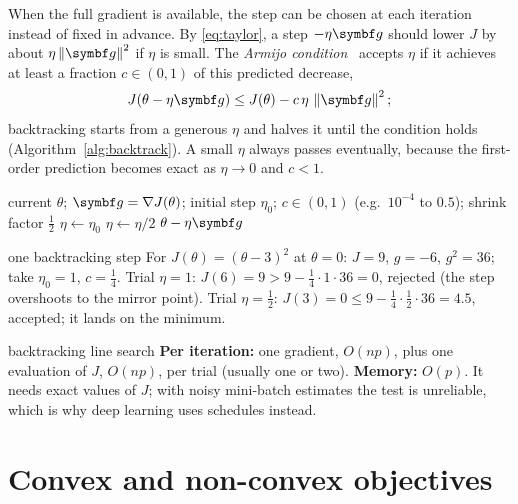 \documentclass[11pt]{article}
\newcommand{\gvec}{\vect{g}}
\begin{document}
When the full gradient is available, the step can be chosen at each iteration instead of fixed in advance. By
\eqref{eq:taylor}, a step $-\eta\gvec$ should lower $J$ by about $\eta\norm{\gvec}^2$ if $\eta$ is small. The
\emph{Armijo condition}~\cite{armijo1966} accepts $\eta$ if it achieves at least a fraction $c \in (0, 1)$ of this
predicted decrease,
\[
  J(\theta - \eta\gvec) \le J(\theta) - c\,\eta\,\norm{\gvec}^2 ;
\]
backtracking starts from a generous $\eta$ and halves it until the condition holds (Algorithm~\ref{alg:backtrack}).
A small $\eta$ always passes eventually, because the first-order prediction becomes exact as $\eta \to 0$ and $c < 1$.

\begin{algorithm}[tb]
\caption{Gradient step with backtracking (Armijo) line search}\label{alg:backtrack}
\begin{algorithmic}[1]
\Require current $\theta$; $\gvec = \nabla J(\theta)$; initial step $\eta_0$; $c \in (0, 1)$ (e.g.\ $10^{-4}$ to $0.5$); shrink factor $\frac12$
\Function{BacktrackingStep}{$\theta, \gvec$}
  \State $\eta \gets \eta_0$
  \While{$J(\theta - \eta\gvec) > J(\theta) - c\,\eta\norm{\gvec}^2$} 
    \State $\eta \gets \eta/2$
  \EndWhile
  \State \Return $\theta - \eta\gvec$
\EndFunction
\end{algorithmic}
\end{algorithm}

\begin{worked}{one backtracking step}
For $J(\theta) = (\theta - 3)^2$ at $\theta = 0$: $J = 9$, $g = -6$, $g^2 = 36$; take $\eta_0 = 1$, $c = \frac14$.
Trial $\eta = 1$: $J(6) = 9 > 9 - \frac14 \cdot 1 \cdot 36 = 0$, rejected (the step overshoots to the mirror point).
Trial $\eta = \frac12$: $J(3) = 0 \le 9 - \frac14 \cdot \frac12 \cdot 36 = 4.5$, accepted; it lands on the minimum.
\end{worked}

\begin{runtime}{backtracking line search}
\textbf{Per iteration:} one gradient, $O(np)$, plus one evaluation of $J$, $O(np)$, per trial (usually one or two).
\textbf{Memory:} $O(p)$. It needs exact values of $J$; with noisy mini-batch estimates the test is unreliable, which
is why deep learning uses schedules instead.
\end{runtime}

\section{Convex and non-convex objectives}\label{sec:convex}
\end{document}
